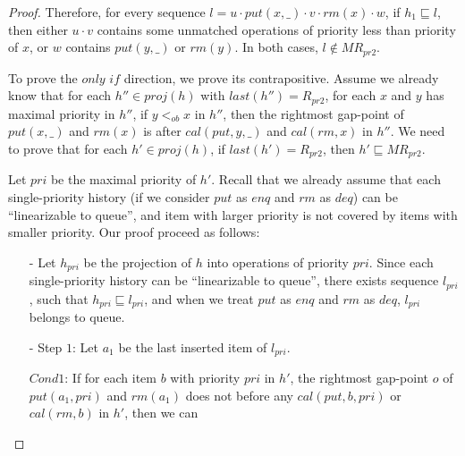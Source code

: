 \documentclass{llncs}
\begin{document}
\begin {proof}
Therefore, for every sequence $l = u \cdot \textit{put}(x,\_) \cdot v \cdot \textit{rm}(x) \cdot w$, if $h_1 \sqsubseteq l$, then either $u \cdot v$ contains some unmatched operations of priority less than priority of $x$, or $w$ contains $\textit{put}(y,\_)$ or $\textit{rm}(y)$. In both cases, $l \notin \textit{MR}_{\textit{pr2}}$.

To prove the $\textit{only if}$ direction, we prove its contrapositive. Assume we already know that for each $h'' \in \textit{proj}(h)$ with $\textit{last}(h'') = R_{\textit{pr2}}$, for each $x$ and $y$ has maximal priority in $h''$, if $y <_{\textit{ob}} x$ in $h''$, then the rightmost gap-point of $\textit{put}(x,\_)$ and $\textit{rm}(x)$ is after $\textit{cal}(\textit{put},y,\_)$ and $\textit{cal}(\textit{rm},x)$ in $h''$. We need to prove that for each $h' \in \textit{proj}(h)$, if $\textit{last}(h') = R_{\textit{pr2}}$, then $h' \sqsubseteq \textit{MR}_{\textit{pr2}}$.

Let $\textit{pri}$ be the maximal priority of $h'$. Recall that we already assume that each single-priority history (if we consider $\textit{put}$ as $\textit{enq}$ and $\textit{rm}$ as $\textit{deq}$) can be ``linearizable to queue'', and item with larger priority is not covered by items with smaller priority. Our proof proceed as follows:

\begin{itemize}
\setlength{\itemsep}{0.5pt}
\item[-] Let $h_{\textit{pri}}$ be the projection of $h$ into operations of priority $\textit{pri}$. Since each single-priority history can be ``linearizable to queue'', there exists sequence $l_{\textit{pri}}$, such that $h_{\textit{pri}} \sqsubseteq l_{\textit{pri}}$, and when we treat $\textit{put}$ as $\textit{enq}$ and $\textit{rm}$ as $\textit{deq}$, $l_{\textit{pri}}$ belongs to queue.

\item[-] Step $1$: Let $a_1$ be the last inserted item of $l_{\textit{pri}}$.

$\textit{Cond1}$: If for each item $b$ with priority $\textit{pri}$ in $h'$, the rightmost gap-point $o$ of $\textit{put}(a_1,\textit{pri})$ and $\textit{rm}(a_1)$ does not before any $\textit{cal}(\textit{put},b,\textit{pri})$ or $\textit{cal}(\textit{rm},b)$ in $h'$, then we can


\end{itemize}
\end{proof}
\end{document}
